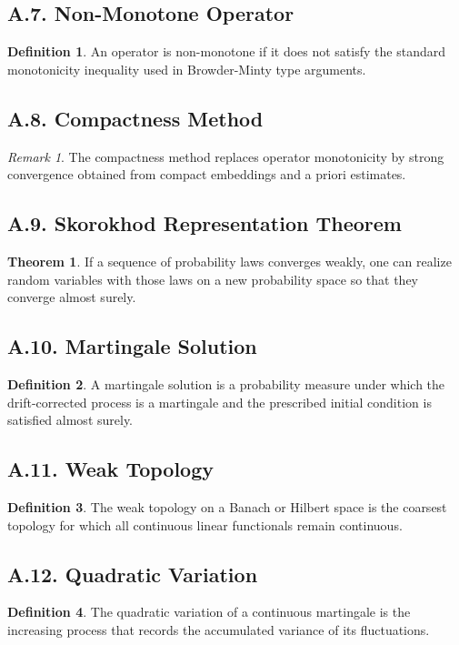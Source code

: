 \documentclass[11pt]{article}
\theoremstyle{definition}
\newtheorem{definition}{Definition}
\newtheorem{theorem}{Theorem}
\theoremstyle{remark}
\newtheorem{remark}{Remark}
\begin{document}
\subsection*{A.7. Non-Monotone Operator}
\begin{definition}
An operator is non-monotone if it does not satisfy the standard monotonicity inequality used in Browder-Minty type arguments.
\end{definition}

\subsection*{A.8. Compactness Method}
\begin{remark}
The compactness method replaces operator monotonicity by strong convergence obtained from compact embeddings and a priori estimates.
\end{remark}

\subsection*{A.9. Skorokhod Representation Theorem}
\begin{theorem}
If a sequence of probability laws converges weakly, one can realize random variables with those laws on a new probability space so that they converge almost surely.
\end{theorem}

\subsection*{A.10. Martingale Solution}
\begin{definition}
A martingale solution is a probability measure under which the drift-corrected process is a martingale and the prescribed initial condition is satisfied almost surely.
\end{definition}

\subsection*{A.11. Weak Topology}
\begin{definition}
The weak topology on a Banach or Hilbert space is the coarsest topology for which all continuous linear functionals remain continuous.
\end{definition}

\subsection*{A.12. Quadratic Variation}
\begin{definition}
The quadratic variation of a continuous martingale is the increasing process that records the accumulated variance of its fluctuations.
\end{definition}
\end{document}
